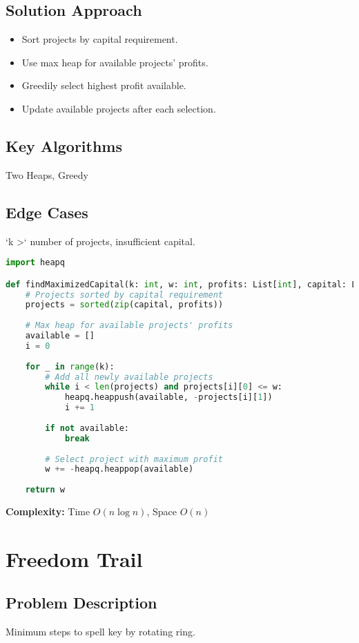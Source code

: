 \documentclass[10pt, a4paper]{article}
\begin{document}
\subsection*{Solution Approach}
\begin{itemize}
    \item Sort projects by capital requirement.
    \item Use max heap for available projects' profits.
    \item Greedily select highest profit available.
    \item Update available projects after each selection.
\end{itemize}

\subsection*{Key Algorithms}
Two Heaps, Greedy

\subsection*{Edge Cases}
`k >` number of projects, insufficient capital.

\begin{lstlisting}[language=Python]
import heapq

def findMaximizedCapital(k: int, w: int, profits: List[int], capital: List[int]) -> int:
    # Projects sorted by capital requirement
    projects = sorted(zip(capital, profits))
    
    # Max heap for available projects' profits
    available = []
    i = 0
    
    for _ in range(k):
        # Add all newly available projects
        while i < len(projects) and projects[i][0] <= w:
            heapq.heappush(available, -projects[i][1])
            i += 1
        
        if not available:
            break
        
        # Select project with maximum profit
        w += -heapq.heappop(available)
    
    return w
\end{lstlisting}
\textbf{Complexity:} Time $O(n \log n)$, Space $O(n)$

\section{Freedom Trail}
\subsection*{Problem Description}
Minimum steps to spell key by rotating ring.
\end{document}

